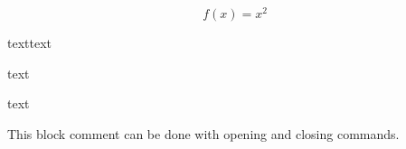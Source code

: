 \documentclass[12pt]{article}
\newcommand\"{quote}
\begin{document}
\begin{equation}
f(x) = x^2
\end{equation}



\mbox{text}{text}
\parbox{text}{text}{text}

\makebox   \break


\begin{comment}
This environment can be used to write
block comments.
\end{comment}


\comment
This block comment can be done with
opening and closing commands.
\endcomment


\end{document}
